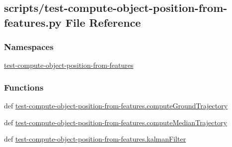\hypertarget{test-compute-object-position-from-features_8py}{\subsection{scripts/test-\/compute-\/object-\/position-\/from-\/features.py File Reference}
\label{test-compute-object-position-from-features_8py}
}
\subsubsection*{Namespaces}
\begin{DoxyCompactItemize}
\item 
\hyperlink{namespacetest-compute-object-position-from-features}{test-\/compute-\/object-\/position-\/from-\/features}
\end{DoxyCompactItemize}
\subsubsection*{Functions}
\begin{DoxyCompactItemize}
\item 
def \hyperlink{namespacetest-compute-object-position-from-features_affcda8bdebff94b2b41a08cb5d5d5477}{test-\/compute-\/object-\/position-\/from-\/features.\-compute\-Ground\-Trajectory}
\item 
def \hyperlink{namespacetest-compute-object-position-from-features_a3eb8aee8e1412f0fe7ea92f63145a4af}{test-\/compute-\/object-\/position-\/from-\/features.\-compute\-Median\-Trajectory}
\item 
def \hyperlink{namespacetest-compute-object-position-from-features_a8696675368f9b4c49211e5e727581968}{test-\/compute-\/object-\/position-\/from-\/features.\-kalman\-Filter}
\end{DoxyCompactItemize}
